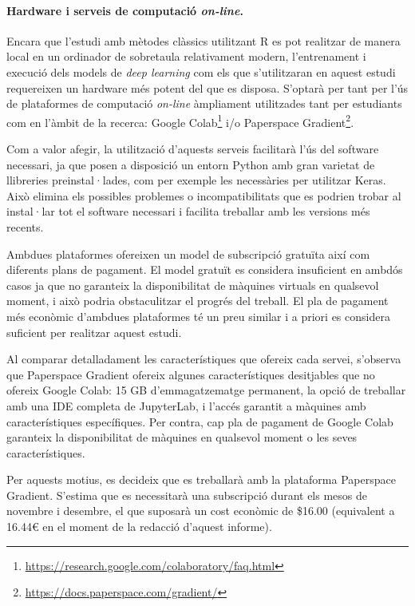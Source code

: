 \documentclass[CAT,BIB]{TFUOC}%
\begin{document}
        \paragraph{Hardware i serveis de computació \textit{on-line}.}

            Encara que l'estudi amb mètodes clàssics utilitzant \textsf{R} es pot realitzar de manera local en un ordinador de sobretaula relativament modern, l'entrenament i execució dels models de \textit{deep learning} com els que s'utilitzaran en aquest estudi requereixen un hardware més potent del que es disposa. S'optarà per tant per l'ús de plataformes de computació \textit{on-line} àmpliament utilitzades tant per estudiants com en l'àmbit de la recerca: Google Colab\footnote{\url{https://research.google.com/colaboratory/faq.html}} i/o Paperspace Gradient\footnote{\url{https://docs.paperspace.com/gradient/}}.

            Com a valor afegir, la utilització d'aquests serveis facilitarà l'ús del software necessari, ja que posen a disposició un entorn Python amb gran varietat de llibreries preinstal·lades, com per exemple les necessàries per utilitzar Keras. Això elimina els possibles problemes o incompatibilitats que es podrien trobar al instal·lar tot el software necessari i facilita treballar amb les versions més recents.

            Ambdues plataformes ofereixen un model de subscripció gratuïta així com diferents plans de pagament. El model gratuït es considera insuficient en ambdós casos ja que no garanteix la disponibilitat de màquines virtuals en qualsevol moment, i això podria obstaculitzar el progrés del treball. El pla de pagament més econòmic d'ambdues plataformes té un preu similar i a priori es considera suficient per realitzar aquest estudi.

            Al comparar detalladament les característiques que ofereix cada servei, s'observa que Paperspace Gradient ofereix algunes característiques desitjables que no ofereix Google Colab: 15 GB d'emmagatzematge permanent, la opció de treballar amb una IDE completa de JupyterLab, i l'accés garantit a màquines amb característiques específiques. Per contra, cap pla de pagament de Google Colab garanteix la disponibilitat de màquines en qualsevol moment o les seves característiques.

            Per aquests motius, es decideix que es treballarà amb la plataforma Paperspace Gradient. S'estima que es necessitarà una subscripció durant els mesos de novembre i desembre, el que suposarà un cost econòmic de \$16.00 (equivalent a 16.44€ en el moment de la redacció d'aquest informe).
\end{document}
